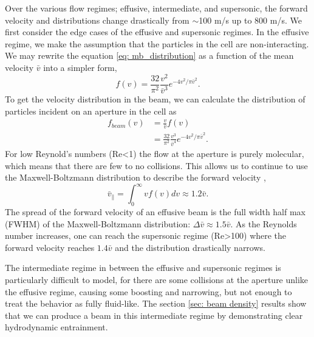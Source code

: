 Over the various flow regimes; effusive, intermediate, and supersonic, the forward velocity and distributions change drastically from $\sim$100 m/s up to 800 m/s. We first consider the edge cases of the effusive and supersonic regimes. In the effusive regime, we make the assumption that the particles in the cell are non-interacting. We may rewrite the equation \ref{eq: mb_distribution} as a function of the mean velocity $\bar{v}$ into a simpler form,
\begin{equation}
	f(v) = \frac{32}{\pi^2} \frac{v^2}{\bar{v}^3} e^{-4v^2/\pi \bar{v}^2}. \label{eq: mb_simplified}
\end{equation}
To get the velocity distribution in the beam, we can calculate the distribution of particles incident on an aperture in the cell as
\begin{align*}
	f_{beam}(v) & = \frac{v}{\bar{v}}f(v)  \\
	& = \frac{32}{\pi^2} \frac{v^3}{\bar{v}^4} e^{-4v^2/\pi \bar{v}^2}.
\end{align*}
For low Reynold's numbers (Re<1) the flow at the aperture is purely molecular, which means that there are few to no collisions. This allows us to continue to use the Maxwell-Boltzmann distribution to describe the forward velocity \cite{Hutzler2011c},
\begin{equation}
	\bar{v}_\parallel = \int_0^\infty v f(v) dv \approx 1.2 \bar{v}.
\end{equation}
The spread of the forward velocity of an effusive beam is the full width half max (FWHM) of the Maxwell-Boltzmann distribution: $\Delta\bar{v} \approx 1.5 \bar{v}$. As the Reynolds number increases, one can reach the supersonic regime (Re>100) where the forward velocity reaches $1.4\bar{v}$ and the distribution drastically narrows.\cite{Hutzler2011c,Pauly}

The intermediate regime in between the effusive and supersonic regimes is particularly difficult to model, for there are some collisions at the aperture unlike the effusive regime, causing some boosting and narrowing, but not enough to treat the behavior as fully fluid-like. The section \ref{sec: beam density} results show that we can produce a beam in this intermediate regime by demonstrating clear hydrodynamic entrainment.

